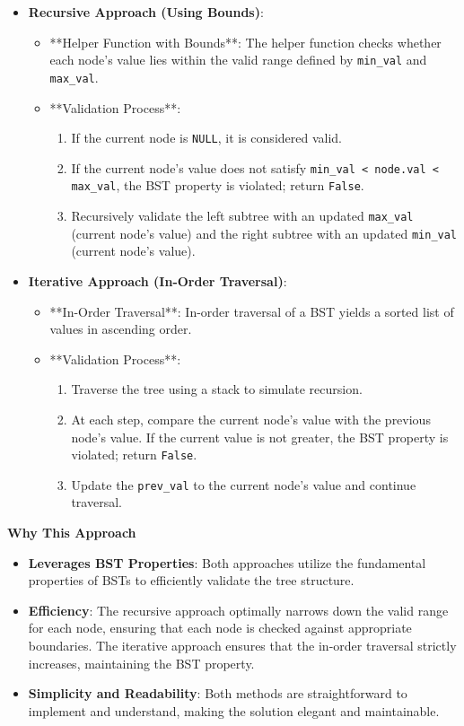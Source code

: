 \begin{itemize}
    \item \textbf{Recursive Approach (Using Bounds)}:
    \begin{itemize}
        \item **Helper Function with Bounds**: The helper function checks whether each node's value lies within the valid range defined by \texttt{min\_val} and \texttt{max\_val}.
        \item **Validation Process**: 
        \begin{enumerate}
            \item If the current node is \texttt{NULL}, it is considered valid.
            \item If the current node's value does not satisfy \texttt{min\_val < node.val < max\_val}, the BST property is violated; return \texttt{False}.
            \item Recursively validate the left subtree with an updated \texttt{max\_val} (current node's value) and the right subtree with an updated \texttt{min\_val} (current node's value).
        \end{enumerate}
    \end{itemize}
    
    \item \textbf{Iterative Approach (In-Order Traversal)}:
    \begin{itemize}
        \item **In-Order Traversal**: In-order traversal of a BST yields a sorted list of values in ascending order.
        \item **Validation Process**:
        \begin{enumerate}
            \item Traverse the tree using a stack to simulate recursion.
            \item At each step, compare the current node's value with the previous node's value. If the current value is not greater, the BST property is violated; return \texttt{False}.
            \item Update the \texttt{prev\_val} to the current node's value and continue traversal.
        \end{enumerate}
    \end{itemize}
\end{itemize}

\textbf{Why This Approach}

\begin{itemize}
    \item \textbf{Leverages BST Properties}: Both approaches utilize the fundamental properties of BSTs to efficiently validate the tree structure.
    \item \textbf{Efficiency}: The recursive approach optimally narrows down the valid range for each node, ensuring that each node is checked against appropriate boundaries. The iterative approach ensures that the in-order traversal strictly increases, maintaining the BST property.
    \item \textbf{Simplicity and Readability}: Both methods are straightforward to implement and understand, making the solution elegant and maintainable.
\end{itemize}

